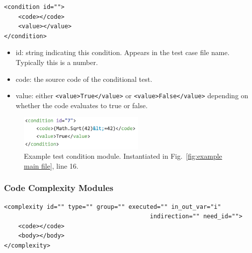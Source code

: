 \documentclass[12pt]{article}
\begin{document}
\begin{verbatim}
<condition id="">
    <code></code>
    <value></value>
</condition>
\end{verbatim}

\begin{itemize}
    \item id: string indicating this condition.  Appears in the test case
      file name.  Typically this is a number.

    \item code: the source code of the conditional test.

    \item value: either \verb|<value>True</value>| or
        \verb|<value>False</value>| depending on \\
        whether the code evaluates to true or false.
\end{itemize}

\begin{figure}[htbp]
  \includegraphics[width=2.4in]{fig_Complexity_file_test.png}
  \caption{Example test condition module.  Instantiated in
    Fig.~\ref{fig:example main file}, line 16.}
  \label{fig:example complexity-test file}
\end{figure}


\subsubsection{Code Complexity Modules}
\label{sec: complexity modules}

\begin{verbatim}
<complexity id="" type="" group="" executed="" in_out_var="i" 
                                         indirection="" need_id="">
    <code></code>
    <body></body>
</complexity>
\end{verbatim}
\end{document}
